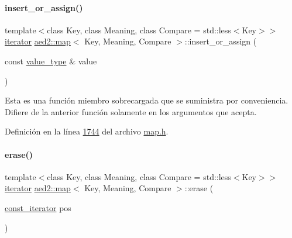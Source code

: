 \mbox{\label{classaed2_1_1map_a9128a806713bcc999ebd8a97ab77e765_a9128a806713bcc999ebd8a97ab77e765}} 
\paragraph{\texorpdfstring{insert\+\_\+or\+\_\+assign()}{insert\_or\_assign()}\hspace{0.1cm}{\footnotesize\ttfamily [2/2]}}
{\footnotesize\ttfamily template$<$class Key, class Meaning, class Compare = std\+::less$<$\+Key$>$$>$ \\
\hyperlink{classaed2_1_1map_1_1iterator}{iterator} \hyperlink{classaed2_1_1map}{aed2\+::map}$<$ Key, Meaning, Compare $>$\+::insert\+\_\+or\+\_\+assign (\begin{DoxyParamCaption}\item[{const \hyperlink{classaed2_1_1map_a719db98e0ff9a837610f76be33264680_a719db98e0ff9a837610f76be33264680}{value\+\_\+type} \&}]{value }\end{DoxyParamCaption})\hspace{0.3cm}{\ttfamily [inline]}}

Esta es una función miembro sobrecargada que se suministra por conveniencia. Difiere de la anterior función solamente en los argumentos que acepta. 

Definición en la línea \hyperlink{map_8h_source_l01744}{1744} del archivo \hyperlink{map_8h_source}{map.\+h}.

\mbox{\label{classaed2_1_1map_ad8e796bf9c9c558e5ce6b61e116253fe_ad8e796bf9c9c558e5ce6b61e116253fe}} 
\paragraph{\texorpdfstring{erase()}{erase()}\hspace{0.1cm}{\footnotesize\ttfamily [1/2]}}
{\footnotesize\ttfamily template$<$class Key, class Meaning, class Compare = std\+::less$<$\+Key$>$$>$ \\
\hyperlink{classaed2_1_1map_1_1iterator}{iterator} \hyperlink{classaed2_1_1map}{aed2\+::map}$<$ Key, Meaning, Compare $>$\+::erase (\begin{DoxyParamCaption}\item[{\hyperlink{classaed2_1_1map_1_1const__iterator}{const\+\_\+iterator}}]{pos }\end{DoxyParamCaption})\hspace{0.3cm}{\ttfamily [inline]}}



